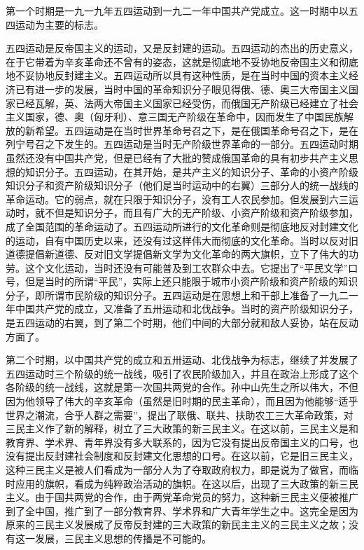 第一个时期是一九一九年五四运动到一九二一年中国共产党成立。这一时期中以五四运动为主要的标志。

五四运动是反帝国主义的运动，又是反封建的运动。五四运动的杰出的历史意义，在于它带着为辛亥革命还不曾有的姿态，这就是彻底地不妥协地反帝国主义和彻底地不妥协地反封建主义。五四运动所以具有这种性质，是在当时中国的资本主义经济已有进一步的发展，当时中国的革命知识分子眼见得俄、德、奥三大帝国主义国家已经瓦解，英、法两大帝国主义国家已经受伤，而俄国无产阶级已经建立了社会主义国家，德、奥（匈牙利）、意三国无产阶级在革命中，因而发生了中国民族解放的新希望。五四运动是在当时世界革命号召之下，是在俄国革命号召之下，是在列宁号召之下发生的。五四运动是当时无产阶级世界革命的一部分。五四运动时期虽然还没有中国共产党，但是已经有了大批的赞成俄国革命的具有初步共产主义思想的知识分子。五四运动，在其开始，是共产主义的知识分子、革命的小资产阶级知识分子和资产阶级知识分子（他们是当时运动中的右翼）三部分人的统一战线的革命运动。它的弱点，就在只限于知识分子，没有工人农民参加。但发展到六三运动时，就不但是知识分子，而且有广大的无产阶级、小资产阶级和资产阶级参加，成了全国范围的革命运动了。五四运动所进行的文化革命则是彻底地反对封建文化的运动，自有中国历史以来，还没有过这样伟大而彻底的文化革命。当时以反对旧道德提倡新道德、反对旧文学提倡新文学为文化革命的两大旗帜，立下了伟大的功劳。这个文化运动，当时还没有可能普及到工农群众中去。它提出了“平民文学”口号，但是当时的所谓“平民”，实际上还只能限于城市小资产阶级和资产阶级的知识分子，即所谓市民阶级的知识分子。五四运动是在思想上和干部上准备了一九二一年中国共产党的成立，又准备了五卅运动和北伐战争。当时的资产阶级知识分子，是五四运动的右翼，到了第二个时期，他们中间的大部分就和敌人妥协，站在反动方面了。

第二个时期，以中国共产党的成立和五卅运动、北伐战争为标志，继续了并发展了五四运动时三个阶级的统一战线，吸引了农民阶级加入，并且在政治上形成了这个各阶级的统一战线，这就是第一次国共两党的合作。孙中山先生之所以伟大，不但因为他领导了伟大的辛亥革命（虽然是旧时期的民主革命），而且因为他能够“适乎世界之潮流，合乎人群之需要”，提出了联俄、联共、扶助农工三大革命政策，对三民主义作了新的解释，树立了三大政策的新三民主义。在这以前，三民主义是和教育界、学术界、青年界没有多大联系的，因为它没有提出反帝国主义的口号，也没有提出反封建社会制度和反封建文化思想的口号。在这以前，它是旧三民主义，这种三民主义是被人们看成为一部分人为了夺取政府权力，即是说为了做官，而临时应用的旗帜，看成为纯粹政治活动的旗帜。在这以后，出现了三大政策的新三民主义。由于国共两党的合作，由于两党革命党员的努力，这种新三民主义便被推广到了全中国，推广到了一部分教育界、学术界和广大青年学生之中。这完全是因为原来的三民主义发展成了反帝反封建的三大政策的新民主主义的三民主义之故；没有这一发展，三民主义思想的传播是不可能的。

